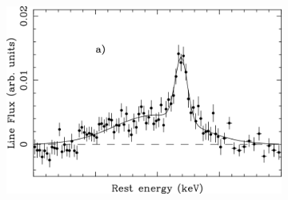 \documentclass[10pt,a4paper,english]{article}
\begin{document}
\begin{figure}[!ht]
  \begin{subfigure}[t]{.595\textwidth}
    \includegraphics[width=\columnwidth]{figures/nandra1997.png}
    \label{fig:nandra1997}
    \caption{\cite{1997ApJ...477..602N}}
  \end{subfigure}
  \begin{subfigure}[t]{.395\textwidth}

\end{subfigure}
\end{figure}
\end{document}
